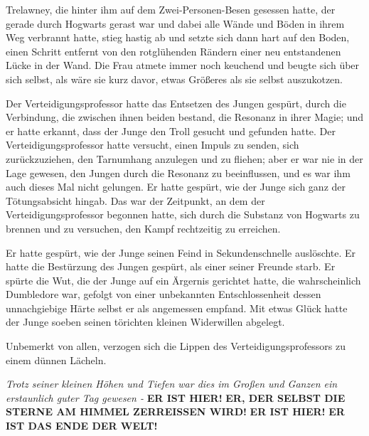 Trelawney, die hinter ihm auf dem Zwei-Personen-Besen gesessen hatte, der gerade
durch Hogwarts gerast war und dabei alle Wände und Böden in ihrem Weg verbrannt
hatte, stieg hastig ab und setzte sich dann hart auf den Boden, einen Schritt
entfernt von den rotglühenden Rändern einer neu entstandenen Lücke in der Wand.
Die Frau atmete immer noch keuchend und beugte sich über sich selbst, als wäre
sie kurz davor, etwas Größeres als sie selbst auszukotzen.

Der Verteidigungsprofessor hatte das Entsetzen des Jungen gespürt, durch die
Verbindung, die zwischen ihnen beiden bestand, die Resonanz in ihrer Magie; und
er hatte erkannt, dass der Junge den Troll gesucht und gefunden hatte. Der
Verteidigungsprofessor hatte versucht, einen Impuls zu senden, sich
zurückzuziehen, den Tarnumhang anzulegen und zu fliehen; aber er war nie in der
Lage gewesen, den Jungen durch die Resonanz zu beeinflussen, und es war ihm auch
dieses Mal nicht gelungen. Er hatte gespürt, wie der Junge sich ganz der
Tötungsabsicht hingab. Das war der Zeitpunkt, an dem der Verteidigungsprofessor
begonnen hatte, sich durch die Substanz von Hogwarts zu brennen und zu
versuchen, den Kampf rechtzeitig zu erreichen.

Er hatte gespürt, wie der Junge seinen Feind in Sekundenschnelle auslöschte. Er
hatte die Bestürzung des Jungen gespürt, als einer seiner Freunde starb. Er
spürte die Wut, die der Junge auf ein Ärgernis gerichtet hatte, die
wahrscheinlich Dumbledore war, gefolgt von einer unbekannten Entschlossenheit
dessen unnachgiebige Härte selbst er als angemessen empfand. Mit etwas Glück
hatte der Junge soeben seinen törichten kleinen Widerwillen abgelegt.

Unbemerkt von allen, verzogen sich die Lippen des Verteidigungsprofessors zu
einem dünnen Lächeln.

\emph{Trotz seiner kleinen Höhen und Tiefen war dies im Großen und Ganzen ein
erstaunlich guter Tag gewesen -} \textbf{ \glqq{}ER IST HIER!}
\textbf{ER, DER SELBST DIE STERNE AM HIMMEL ZERREISSEN WIRD!}
\textbf{ER IST HIER!} \textbf{ER IST DAS ENDE DER WELT!\grqq{}}

